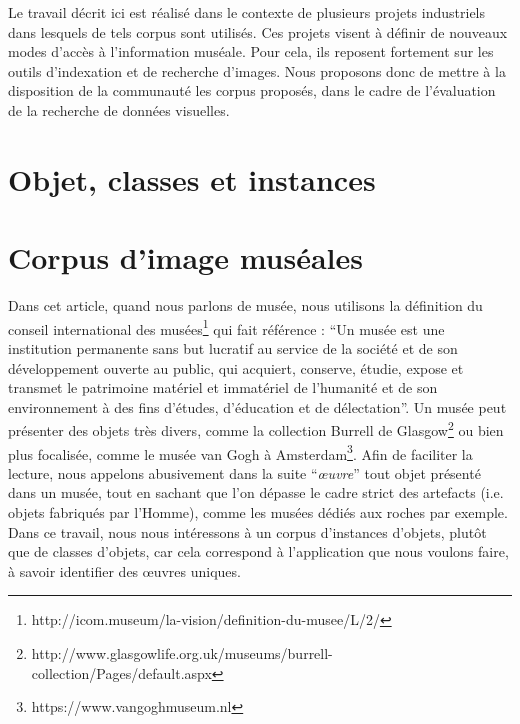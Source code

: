Le travail décrit ici est réalisé dans le contexte de plusieurs projets industriels dans lesquels de tels corpus sont utilisés. Ces projets visent à définir de nouveaux modes d'accès à l'information muséale. Pour cela, ils reposent fortement sur les outils d'indexation et de recherche d'images. Nous proposons donc de mettre à la disposition de la communauté les corpus proposés, dans le cadre de l'évaluation de la recherche de données visuelles.




\section{Objet, classes et instances}



\section{Corpus d'image muséales}


Dans cet article, quand nous parlons de musée, nous utilisons la définition du conseil international des musées\footnote{http://icom.museum/la-vision/definition-du-musee/L/2/} qui fait référence :
``Un musée est une institution permanente sans but lucratif au service de la société et de son développement ouverte au public, qui acquiert, conserve, étudie, expose et transmet le patrimoine matériel et immatériel de l’humanité et de son environnement à des fins d'études, d'éducation et de délectation''. Un musée peut présenter des objets très divers, comme la collection Burrell de Glasgow\footnote{http://www.glasgowlife.org.uk/museums/burrell-collection/Pages/default.aspx} ou bien plus focalisée, comme le musée van Gogh à Amsterdam\footnote{https://www.vangoghmuseum.nl}. Afin de faciliter la lecture, nous appelons abusivement dans la suite ``{\it œuvre}'' tout objet présenté dans un musée, tout en sachant que l'on dépasse le cadre strict des artefacts (i.e. objets fabriqués par l'Homme), comme les musées dédiés aux roches par exemple.
Dans ce travail, nous nous intéressons à un corpus d'instances d'objets, plutôt que de classes d'objets, car cela correspond à l'application que nous voulons faire, à savoir identifier des œuvres uniques.

